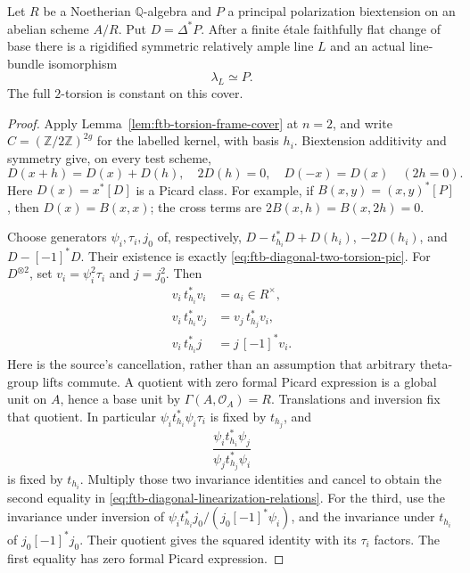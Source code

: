 \begin{srlemma}
\label{lem:ftb-symmetric-principal-root-cover}
Let \(R\) be a Noetherian \(\mathbb Q\)-algebra and \(P\) a
principal polarization biextension on an abelian scheme \(A/R\).
Put \(D=\Delta^*P\).
After a finite \'{e}tale faithfully flat change of base there
is a rigidified symmetric relatively ample line \(L\) and an
actual line-bundle isomorphism
\[
                             \lambda_L\simeq P.
 \tag{F1}\label{eq:ftb-family-actual-square-root}
\]
The full \(2\)-torsion is constant on this cover.
\end{srlemma}
\begin{proof}
Apply Lemma~\ref{lem:ftb-torsion-frame-cover} at \(n=2\), and
write \(C=(\mathbb Z/2\mathbb Z)^{2g}\) for the labelled
kernel, with basis \(h_i\).
Biextension additivity and symmetry give, on every test scheme,
\[
 D(x+h)=D(x)+D(h),\quad 2D(h)=0,\quad D(-x)=D(x)
                                                  \quad(2h=0).
 \tag{F2}\label{eq:ftb-diagonal-two-torsion-pic}
\]
Here \(D(x)=x^*[D]\) is a Picard class.
For example, if \(B(x,y)=(x,y)^*[P]\), then \(D(x)=B(x,x)\);
the cross terms are \(2B(x,h)=B(x,2h)=0\).

Choose generators \(\psi_i,\tau_i,j_0\) of, respectively,
\(D-t_{h_i}^*D+D(h_i)\), \(-2D(h_i)\), and \(D-[-1]^*D\).
Their existence is exactly \eqref{eq:ftb-diagonal-two-torsion-pic}.
For \(D^{\otimes2}\), set \(v_i=\psi_i^2\tau_i\) and \(j=j_0^2\).
Then
\begin{align}
 v_i\,t_{h_i}^*v_i&=a_i\in R^\times,\\
 v_i\,t_{h_i}^*v_j&=v_j\,t_{h_j}^*v_i,\\
 v_i\,t_{h_i}^*j&=j\,[-1]^*v_i.                  \tag{F3}
 \label{eq:ftb-diagonal-linearization-relations}
\end{align}
Here is the source's cancellation, rather than an assumption
that arbitrary theta-group lifts commute.
A quotient with zero formal Picard expression is a global unit
on \(A\), hence a base unit by \(\Gamma(A,\mathcal O_A)=R\).
Translations and inversion fix that quotient.
In particular \(\psi_i t_{h_i}^*\psi_i\tau_i\) is fixed by
\(t_{h_j}\), and
\[
 \frac{\psi_i t_{h_i}^*\psi_j}{\psi_j t_{h_j}^*\psi_i}
\]
is fixed by \(t_{h_i}\).
Multiply those two invariance identities and cancel to obtain
the second equality in \eqref{eq:ftb-diagonal-linearization-relations}.
For the third, use the invariance under inversion of
\(\psi_i t_{h_i}^*j_0/(j_0[-1]^*\psi_i)\), and the invariance
under \(t_{h_i}\) of \(j_0[-1]^*j_0\).
Their quotient gives the squared identity with its \(\tau_i\)
factors.  The first equality has zero formal Picard expression.


\end{proof}
